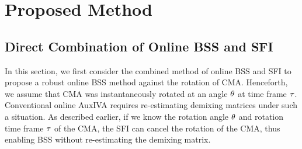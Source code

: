 \documentclass[sip,biber]{now-journal}
\begin{document}
\section{Proposed Method}\label{sec:proposed}

\subsection{Direct Combination of Online BSS and SFI}

In this section, we first consider the combined method of online BSS and SFI \cite{Wakabayashi:2023:ASLP} to propose a robust online BSS method against the rotation of CMA.
Henceforth, we assume that CMA was instantaneously rotated at an angle $\theta$ at time frame $\tau$.
Conventional online AuxIVA requires re-estimating demixing matrices under such a situation.
As described earlier, if we know the rotation angle $\theta$ and rotation time frame $\tau$ of the CMA, the SFI can cancel the rotation of the CMA, thus enabling BSS without re-estimating the demixing matrix.
\end{document}
